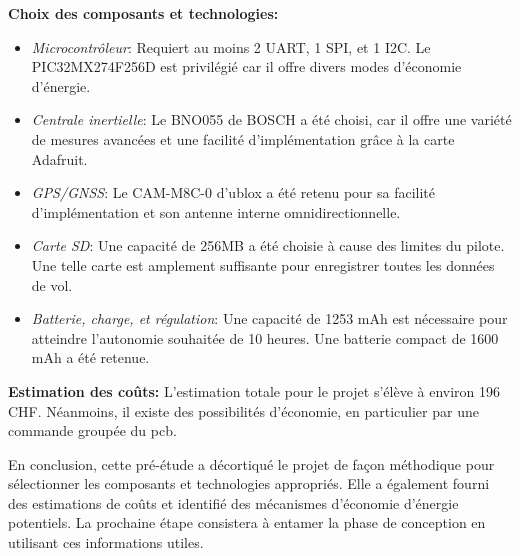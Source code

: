 \textbf{Choix des composants et technologies:}
\begin{itemize}
	\item \textit{Microcontrôleur}: Requiert au moins 2 UART, 1 SPI, et 1 I2C. Le PIC32MX274F256D est privilégié car il offre divers modes d'économie d'énergie.
	\item \textit{Centrale inertielle}: Le BNO055 de BOSCH a été choisi, car il offre une variété de mesures avancées et une facilité d'implémentation grâce à la carte Adafruit.
	\item \textit{GPS/GNSS}: Le CAM-M8C-0 d'ublox a été retenu pour sa facilité d'implémentation et son antenne interne omnidirectionnelle.
	\item \textit{Carte SD}: Une capacité de 256MB a été choisie à cause des limites du pilote. Une telle carte est amplement suffisante pour enregistrer toutes les données de vol.
	\item \textit{Batterie, charge, et régulation}: Une capacité de 1253 mAh est nécessaire pour atteindre l'autonomie souhaitée de 10 heures. Une batterie compact de 1600 mAh a été retenue.
\end{itemize}

\textbf{Estimation des coûts:}
L'estimation totale pour le projet s'élève à environ 196 CHF. Néanmoins, il existe des possibilités d'économie, en particulier par une commande groupée du \gls{pcb}.

En conclusion, cette pré-étude a décortiqué le projet de façon méthodique pour sélectionner les composants et technologies appropriés. Elle a également fourni des estimations de coûts et identifié des mécanismes d'économie d'énergie potentiels. La prochaine étape consistera à entamer la phase de conception en utilisant ces informations utiles.
